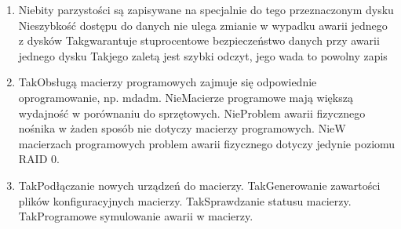 \begin{enumerate}
		\newpage
		\item {}%
		{Nie}{bity parzystości są zapisywane na specjalnie do tego przeznaczonym dysku}%
		{Nie}{szybkość dostępu do danych nie ulega zmianie w wypadku awarii jednego z dysków}%
		{Tak}{gwarantuje stuprocentowe bezpieczeństwo danych przy awarii jednego dysku}%
		{Tak}{jego zaletą jest szybki odczyt, jego wada to powolny zapis}
		\item {}%
		{Tak}{Obsługą macierzy programowych zajmuje się odpowiednie oprogramowanie, np. mdadm.}%
		{Nie}{Macierze programowe mają większą wydajność w porównaniu do sprzętowych.}%
		{Nie}{Problem awarii fizycznego nośnika w żaden sposób nie dotyczy macierzy programowych.}%
		{Nie}{W macierzach programowych problem awarii fizycznego dotyczy jedynie poziomu RAID 0.}
		\item {}%
		{Tak}{Podłączanie nowych urządzeń do macierzy.}%
		{Tak}{Generowanie zawartości plików konfiguracyjnych macierzy.}%
		{Tak}{Sprawdzanie statusu macierzy.}%
		{Tak}{Programowe symulowanie awarii w macierzy.}
		
		
		
		
		
	\end{enumerate}